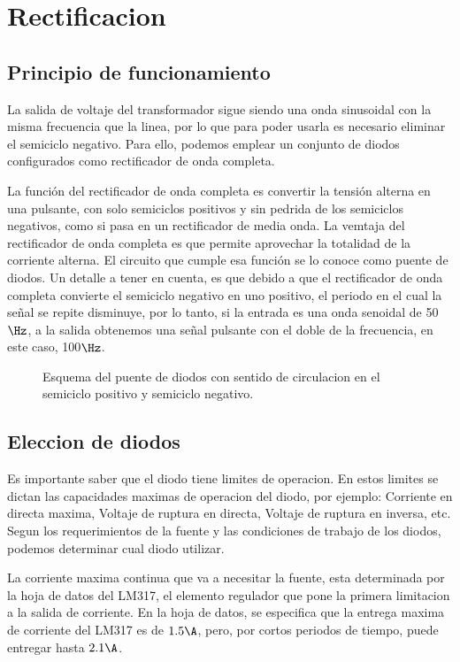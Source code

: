 \documentclass[chaptersright]{informeutn}
\begin{document}
      \section{Rectificacion}
        \subsection{Principio de funcionamiento}
          La salida de voltaje del transformador sigue siendo una onda sinusoidal con la misma frecuencia que la linea,
          por lo que para poder usarla es necesario eliminar el semiciclo negativo. Para ello, podemos emplear un
          conjunto de diodos configurados como rectificador de onda completa.

          La función del rectificador de onda completa es convertir la tensión alterna en una pulsante, con solo
          semiciclos positivos y sin pedrida de los semiciclos negativos, como si pasa en un rectificador de media
          onda. La vemtaja del rectificador de onda completa es que permite aprovechar la totalidad de la corriente
          alterna. El circuito que cumple esa función se lo conoce como puente de diodos. Un detalle a tener en cuenta,
          es que debido a que el rectificador de onda completa convierte el semiciclo negativo en uno positivo, el
          periodo en el cual la señal se repite disminuye, por lo tanto, si la entrada es una onda senoidal de 50$\Hz$,
          a la salida obtenemos una señal pulsante con el doble de la frecuencia, en este caso, 100$\Hz$.
          \begin{figure}[!h]
            \centering
            \caption{Esquema del puente de diodos con sentido de circulacion en el semiciclo positivo y semiciclo
            negativo.}
          \end{figure}


        \subsection{Eleccion de diodos}
          Es importante saber que el diodo tiene limites de operacion. En estos limites se dictan las capacidades
          maximas de operacion del diodo, por ejemplo: Corriente en directa maxima, Voltaje de ruptura en directa,
          Voltaje de ruptura en inversa, etc. Segun los requerimientos de la fuente y las condiciones de trabajo de los
          diodos, podemos determinar cual diodo utilizar.

          La corriente maxima continua que va a necesitar la fuente, esta determinada por la hoja de datos del LM317,
          el elemento regulador que pone la primera limitacion a la salida de corriente. En la hoja de datos, se
          especifica que la entrega maxima de corriente del LM317 es de $1.5\A$, pero, por cortos periodos de tiempo,
          puede entregar hasta $2.1\A$.
\end{document}
